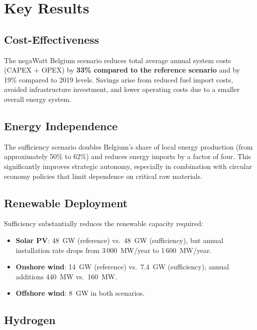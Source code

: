 \section{Key Results}

\subsection{Cost-Effectiveness}

The negaWatt Belgium scenario reduces total average annual system costs
(CAPEX + OPEX) by \textbf{33\% compared to the reference scenario} and by 19\%
compared to 2019 levels. Savings arise from reduced fuel import costs, avoided
infrastructure investment, and lower operating costs due to a smaller overall
energy system.

\subsection{Energy Independence}

The sufficiency scenario doubles Belgium's share of local energy production
(from approximately 50\% to 62\%) and reduces energy imports by a factor of four.
This significantly improves strategic autonomy, especially in combination with
circular economy policies that limit dependence on critical raw materials.

\subsection{Renewable Deployment}

Sufficiency substantially reduces the renewable capacity required:

\begin{itemize}[noitemsep]
    \item \textbf{Solar PV}: 48~GW (reference) vs.\ 48~GW (sufficiency), but
          annual installation rate drops from 3\,000~MW/year to 1\,600~MW/year.
    \item \textbf{Onshore wind}: 14~GW (reference) vs.\ 7.4~GW (sufficiency);
          annual additions 440~MW vs.\ 160~MW.
    \item \textbf{Offshore wind}: 8~GW in both scenarios.
\end{itemize}

\subsection{Hydrogen}


